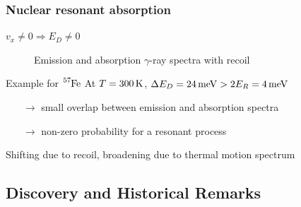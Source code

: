 	\begin{frame}
		\frametitle{Nuclear resonant absorption}
		\begin{block}{$v_x \neq 0 \Rightarrow E_D \neq 0$}
			\begin{figure}
				\centering
				\resizebox{.4\textwidth}{!}{%
					
				}
				\caption{Emission and absorption $\gamma$-ray spectra with recoil \cite{longyang07}}
			\end{figure}
		\end{block}
	
		\begin{block}{Example for $\ce{^{57}Fe}$}
			At $T=\unit[300]{K}$, $\Delta E_D=\unit[24]{meV} > 2 E_R=\unit[4]{meV}$
			\begin{itemize}
				\item[$\rightarrow$] small overlap between emission and absorption spectra
				\item[$\rightarrow$] non-zero probability for a resonant process
			\end{itemize}
			Shifting due to recoil, broadening due to thermal motion spectrum
		\end{block}
	\end{frame}

\subsection{Discovery and Historical Remarks}

